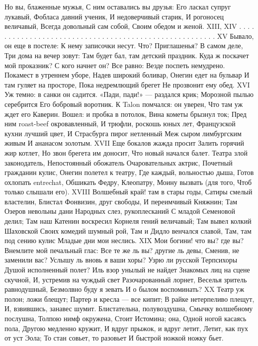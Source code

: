 Но вы, блаженные мужья,
С ним оставались вы друзья:
Его ласкал супруг лукавый,
Фобласа давний ученик,
И недоверчивый старик,
И рогоносец величавый,
Всегда довольный сам собой,
Своим обедом и женой.
XIII, XIV
. . . . . . . . . . . . . . . . . .
. . . . . . . . . . . . . . . . . .
. . . . . . . . . . . . . . . . . .
XV
Бывало, он еще в постеле:
К нему записочки несут.
Что? Приглашенья? В самом деле,
Три дома на вечер зовут:
Там будет бал, там детский праздник.
Куда ж поскачет мой проказник?
С кого начнет он? Все равно:
Везде поспеть немудрено.
Покамест в утреннем уборе,
Надев широкий боливар,
Онегин едет на бульвар
И там гуляет на просторе,
Пока недремлющий брегет
Не прозвонит ему обед.
XVI
Уж темно: в санки он садится.
«Пади, пади!» — раздался крик;
Морозной пылью серебрится
Его бобровый воротник.
К Talon помчался: он уверен,
Что там уж ждет его Каверин.
Вошел: и пробка в потолок,
Вина кометы брызнул ток;
Пред ним roast-beef окровавленный,
И трюфли, роскошь юных лет,
Французской кухни лучший цвет,
И Страсбурга пирог нетленный
Меж сыром лимбургским живым
И ананасом золотым.
XVII
Еще бокалов жажда просит
Залить горячий жир котлет,
Но звон брегета им доносит,
Что новый начался балет.
Театра злой законодатель,
Непостоянный обожатель
Очаровательных актрис,
Почетный гражданин кулис,
Онегин полетел к театру,
Где каждый, вольностью дыша,
Готов охлопать entrechat,
Обшикать Федру, Клеопатру,
Моину вызвать (для того,
Чтоб только слышали его).
XVIII
Волшебный край! там в стары годы,
Сатиры смелый властелин,
Блистал Фонвизин, друг свободы,
И переимчивый Княжнин;
Там Озеров невольны дани
Народных слез, рукоплесканий
С младой Семеновой делил;
Там наш Катенин воскресил
Корнеля гений величавый;
Там вывел колкий Шаховской
Своих комедий шумный рой,
Там и Дидло венчался славой,
Там, там под сению кулис
Младые дни мои неслись.
XIX
Мои богини! что вы? где вы?
Внемлите мой печальный глас:
Все те же ль вы? другие ль девы,
Сменив, не заменили вас?
Услышу ль вновь я ваши хоры?
Узрю ли русской Терпсихоры
Душой исполненный полет?
Иль взор унылый не найдет
Знакомых лиц на сцене скучной,
И, устремив на чуждый свет
Разочарованный лорнет,
Веселья зритель равнодушный,
Безмолвно буду я зевать
И о былом воспоминать?
XX
Театр уж полон; ложи блещут;
Партер и кресла — все кипит;
В райке нетерпеливо плещут,
И, взвившись, занавес шумит.
Блистательна, полувоздушна,
Смычку волшебному послушна,
Толпою нимф окружена,
Стоит Истомина; она,
Одной ногой касаясь пола,
Другою медленно кружит,
И вдруг прыжок, и вдруг летит,
Летит, как пух от уст Эола;
То стан совьет, то разовьет
И быстрой ножкой ножку бьет.
